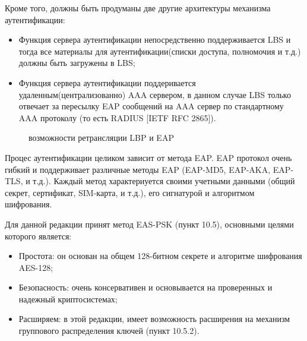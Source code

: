 Кроме того, должны быть продуманы две другие архитектуры механизма аутентификации:
\begin{itemize}
 \item Функция сервера аутентификации непосредственно поддерживается LBS и тогда все материалы для аутентификации(списки доступа, полномочия и т.д.) должны быть загружены в LBS;
 \item Функция сервера аутентификации поддеривается удаленным(централизованно) AAA сервером, в данном случае LBS только отвечает за пересылку EAP сообщений на AAA сервер по стандартному AAA протоколу (то есть RADIUS [IETF RFC 2865]).
\end{itemize}
\begin{figure}[h]
\caption{возможности ретрансляции LBP и EAP}
\label{img:10-1}
\end{figure}

Процес аутентификации целиком зависит от метода EAP. EAP протокол очень гибкий и поддерживает различные методы EAP (EAP-MD5, EAP-AKA, EAP-TLS, и т.д.). Каждый метод характериуется своими учетными данными (общий секрет, сертификат, SIM-карта, и т.д.), его сигнатурой и алгоритмом шифрования.

Для данной редакции принят метод EAS-PSK (пункт 10.5), основными целями которого является:
\begin{itemize}
 \item Простота: он основан на общем 128-битном секрете и алгоритме шифрования AES-128;
 \item Безопасность: очень консервативен и основывается на проверенных и надежный криптосистемах;
 \item Расширяем: в этой редакции, имеет возможность расширения на механизм группового распределения ключей (пункт 10.5.2).
\end{itemize}

